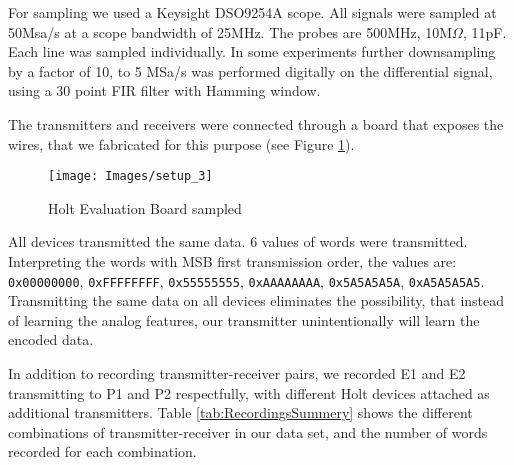 \documentclass[conference]{IEEEtran}
\begin{document}
  For sampling we used a Keysight DSO9254A scope. All signals were sampled at 50Msa/s at a scope bandwidth of 25MHz. The probes are 500MHz, 10M\(\Omega\), 11pF. Each line was sampled individually. In some experiments further downsampling by a factor of 10, to 5 MSa/s was performed digitally on the differential signal, using a 30 point FIR filter with Hamming window.
  
  The transmitters and receivers were connected through a board that exposes the wires, that we fabricated for this purpose (see Figure \ref{fig:SetupImage}).
  
  \begin{figure}[t]
    \centering
    \texttt{[image: Images/setup\_3]}
    \caption{Holt Evaluation Board sampled}
    \label{fig:SetupImage}
  \end{figure}
  
  All devices transmitted the same data. 6 values of words were transmitted. Interpreting the words with MSB first transmission order, the values are: \texttt{0x00000000}, \texttt{0xFFFFFFFF}, \texttt{0x55555555}, \texttt{0xAAAAAAAA}, \texttt{0x5A5A5A5A}, \texttt{0xA5A5A5A5}. Transmitting the same data on all devices eliminates the possibility, that instead of learning the analog features, our transmitter unintentionally will learn the encoded data.
  
  In addition to recording transmitter-receiver pairs, we recorded E1 and E2 transmitting to P1 and P2 respectfully, with different Holt devices attached as additional transmitters. Table \ref{tab:RecordingsSummery} shows the different combinations of transmitter-receiver in our data set, and the number of words recorded for each combination.
  
\end{document}
